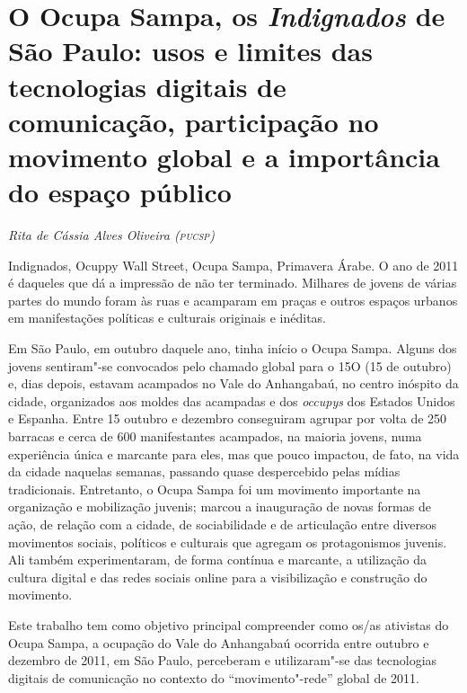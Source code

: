 \chapter*{O Ocupa Sampa, os \emph{Indignados} de São Paulo: usos e limites
das tecnologias digitais de comunicação, participação no movimento
global e a importância do espaço público}

\begin{flushright}
\emph{Rita de Cássia Alves Oliveira (\textsc{pucsp})}
\end{flushright}

Indignados, Ocuppy Wall Street, Ocupa Sampa, Primavera Árabe. O ano de
2011 é daqueles que dá a impressão de não ter terminado. Milhares de
jovens de várias partes do mundo foram às ruas e acamparam em praças e
outros espaços urbanos em manifestações políticas e culturais originais
e inéditas.

Em São Paulo, em outubro daquele ano, tinha início o Ocupa Sampa. Alguns
dos jovens sentiram"-se convocados pelo chamado global para o 15O (15 de
outubro) e, dias depois, estavam acampados no Vale do Anhangabaú, no
centro inóspito da cidade, organizados aos moldes das acampadas e dos
\emph{occupys} dos Estados Unidos e Espanha. Entre 15 outubro e dezembro
conseguiram agrupar por volta de 250 barracas e cerca de 600
manifestantes acampados, na maioria jovens, numa experiência única e
marcante para eles, mas que pouco impactou, de fato, na vida da cidade
naquelas semanas, passando quase despercebido pelas mídias tradicionais.
Entretanto, o Ocupa Sampa foi um movimento importante na organização e
mobilização juvenis; marcou a inauguração de novas formas de ação, de
relação com a cidade, de sociabilidade e de articulação entre diversos
movimentos sociais, políticos e culturais que agregam os protagonismos
juvenis. Ali também experimentaram, de forma contínua e marcante, a
utilização da cultura digital e das redes sociais online para a
visibilização e construção do movimento.

Este trabalho tem como objetivo principal compreender como os/as
ativistas do Ocupa Sampa, a ocupação do Vale do Anhangabaú ocorrida
entre outubro e dezembro de 2011, em São Paulo, perceberam e
utilizaram"-se das tecnologias digitais de comunicação no contexto do
``movimento"-rede'' global de 2011.


